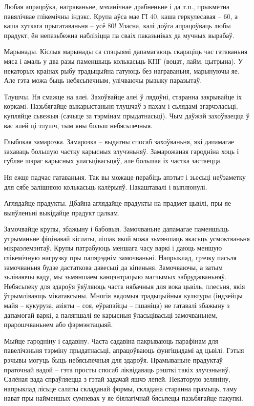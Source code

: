 Любая апрацоўка, награваньне, мэханічнае драбненьне і да т.п., прыкметна павялічвае глікемічны індэкс. Крупа аўса мае ГІ 40, каша геркулесавая – 60, а каша хуткага прыгатаваньня – усё 80! Уласна, калі доўга апрацоўваць любы прадукт, ён непазьбежна наблізіцца па сваіх паказьніках да мучных вырабаў.

Марынады.
Кіслыя марынады са спэцыямі дапамагаюць скараціць час гатаваньня мяса і амаль у два разы паменшыць колькасьць КПГ (воцат, лайм, цытрына). У некаторых краінах рыбу традыцыйна гатуюць без награваньня, марынуючы яе. Але гэта можа быць небясьпечным, улічваючы рызыку паразытаў.

Тлушчы.
Ня смажце на алеі. Захоўвайце алеі ў лядоўні, старанна закрывайце іх коркамі. Пазьбягайце выкарыстаньня тлушчаў з пахам і сьлядамі згарчэласьці, купляйце сьвежыя (сачыце за тэрмінам прыдатнасьці). Чым даўжэй захоўваецца ў вас алей ці тлушч, тым яны больш небясьпечныя.

Глыбокая замарозка.
Замарозка – выдатны спосаб захоўваньня, які дапамагае захаваць большую частку карысных злучэньняў. Замарожаная гародніна хоць і губляе шэраг карысных уласьцівасьцяў, але большая іх частка застаецца.

Ня ежце падчас гатаваньня.
Так вы можаце перабіць апэтыт і зьесьці неўзаметку для сябе залішнюю колькасьць калёрыяў. Пакаштавалі і выплюнулі.

Аглядайце прадукты.
Дбайна аглядайце прадукты на прадмет цьвілі, пры яе выяўленьні выкідайце прадукт цалкам.

Замочвайце крупы, збажыну і бабовыя.
Замочваньне дапамагае паменшыць утрыманьне фіцінавай кіслаты, лішак якой можа зьмяншаць якасьць усмоктваньня мікраэлемэнтаў. Крупы патрабуюць меншага часу варкі і даюць меншую глікемічную нагрузку пры папярэднім замочваньні. Напрыклад, грэчку пасьля замочваньня будзе дастаткова давесьці да кіпеньня. Замочваючы, а затым зьліваючы ваду, мы зьмяншаем канцэнтрацыю магчымых забруджваньняў. Небясьпеку для здароўя ўяўляюць часта нябачныя для вока цьвіль, плесьня, якія ўтрымліваюць мікатаксыны. Многія вядомыя традыцыйныя культуры (індзейцы майя – кукуруза, азіяты – соя, еўрапэйцы – пшаніца) не гатавалі збажыну з дапамогай варкі, а паляпшалі яе карысныя ўласьцівасьці замочваньнем, прарошчваньнем або фэрмэнтацыяй.

Мыйце гародніну і садавіну.
Часта садавіна пакрываюць парафінам для павелічэньня тэрміну прыдатнасьці, апрацоўваюць фунгіцыдамі ад цьвілі. Гэтыя рэчывы могуць быць небясьпечныя для здароўя. Прамываньне прадуктаў праточнай вадой – гэта просты спосаб ліквідаваць рэшткі такіх злучэньняў. Салёная вада спраўляецца з гэтай задачай яшчэ лепей. Некаторую зеляніну, напрыклад лісьце салаты складанай формы, складана старанна прамыць, таму нават пры найменшых сумневах у яе біялагічнай бясьпецы пазьбягайце пакупкі.

